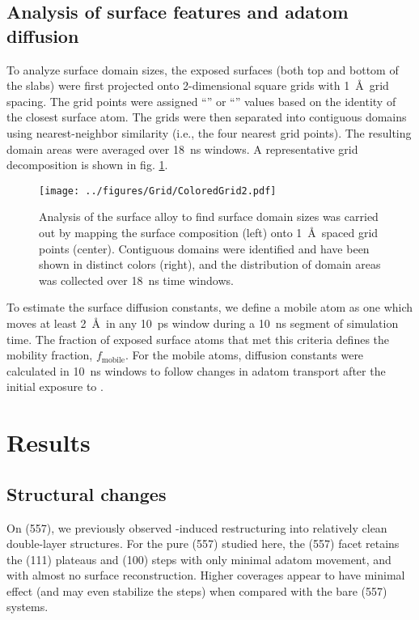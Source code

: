 \documentclass[journal = jpccck, manuscript = article]{achemso}
\begin{document}
\subsection{Analysis of surface features and adatom diffusion}
To analyze surface domain sizes, the exposed surfaces (both top and
bottom of the slabs) were first projected onto 2-dimensional square
grids with 1~\AA\ grid spacing. The grid points were assigned
``'' or ``'' values based on the identity of the closest
surface atom.  The grids were then separated into contiguous domains
using nearest-neighbor similarity (i.e., the four nearest grid
points). The resulting domain areas were averaged over 18~ns windows.
A representative grid decomposition is shown in fig. \ref{fig:grid}.

\begin{figure}
  \texttt{[image: ../figures/Grid/ColoredGrid2.pdf]}
  \caption{Analysis of the surface alloy to find surface domain sizes
    was carried out by mapping the surface composition (left) onto
    1~\AA\ spaced grid points (center).  Contiguous domains were
    identified and have been shown in distinct colors (right), and the
    distribution of domain areas was collected over 18~ns time
    windows.}
\label{fig:grid}
\end{figure}

To estimate the surface diffusion constants, we define a mobile atom
as one which moves at least 2~\AA\ in any 10~ps window during a 10~ns
segment of simulation time.  The fraction of exposed surface atoms
that met this criteria defines the mobility fraction,
$f_\mathrm{mobile}$.  For the mobile atoms, diffusion constants were
calculated in 10~ns windows to follow changes in adatom transport
after the initial exposure to .

\section{Results}
\subsection{Structural changes}
On (557), we previously observed -induced restructuring
into relatively clean double-layer structures.\cite{Michalka:2013} For
the pure (557) studied here, the (557) facet retains the (111)
plateaus and (100) steps with only minimal adatom movement, and with
almost no surface reconstruction.  Higher  coverages appear to
have minimal effect (and may even stabilize the steps) when compared
with the bare (557) systems.
\end{document}
